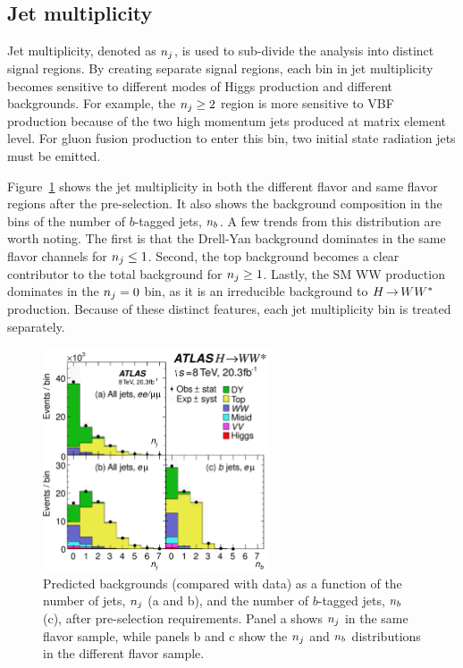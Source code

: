 \subsection{Jet multiplicity}
\label{sec:jetmult}
Jet multiplicity, denoted as $n_j$, is used to sub-divide the analysis into distinct signal regions. By creating separate signal regions, each bin in jet multiplicity becomes sensitive to different modes of Higgs production and different backgrounds. For example, the $n_j \geq 2$ region is more sensitive to VBF production because of the two high momentum jets produced at matrix element level. For gluon fusion production to enter this bin, two initial state radiation jets must be emitted. 

Figure~\ref{fig:njet} shows the jet multiplicity in both the different flavor and same flavor regions after the pre-selection. It also shows the background composition in the bins of the number of $b$-tagged jets, $n_b$. A few trends from this distribution are worth noting. The first is that the Drell-Yan background dominates in the same flavor channels for $n_j \leq 1$. Second, the top background becomes a clear contributor to the total background for $n_j \geq 1$. Lastly, the SM WW production dominates in the $n_j = 0$ bin, as it is an irreducible background to $H{\,{\rightarrow}\,}WW^\ast$ production. Because of these distinct features, each jet multiplicity bin is treated separately.

\begin{figure}[h!]
  \centering
  \captionsetup{justification=centering}

  \includegraphics[width=0.6\textwidth]{figures/njet}
  \caption{Predicted backgrounds (compared with data) as a function of the number of jets, $n_j$ (a and b), and the number of $b$-tagged jets, $n_b$ (c), after pre-selection requirements. Panel a shows $n_j$ in the same flavor sample, while panels b and c show the $n_j$ and $n_b$ distributions in the different flavor sample.}
  \label{fig:njet}
\end{figure}

